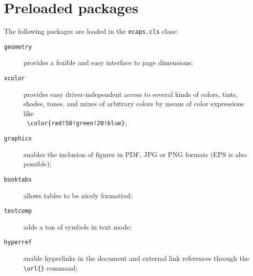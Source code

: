 \documentclass[centerpage]{ecaps}
\begin{document}
\section{Preloaded packages}

The following packages are loaded in the \texttt{ecaps.cls} class:
\begin{description}
\item [\texttt{geometry}]  provides a fexible and easy interface to page dimensions;
\item [\texttt{xcolor}] provides easy driver-independent access to several kinds of colors, tints, shades, tones, and mixes of arbitrary colors by means of color expressions like \\ \texttt{ \textbackslash color\{red!50!green!20!blue\}};
\item [\texttt{graphicx}] enables the inclusion of figures in PDF, JPG or PNG formats (EPS is also possible);
\item [\texttt{booktabs}] allows tables to be nicely formatted;
\item [\texttt{textcomp}] adds a ton of symbols in text mode;
\item [\texttt{hyperref}] enable hyperlinks in the document and external link references through the \texttt{\textbackslash url\{\}} command; 

\end{description}
\end{document}
